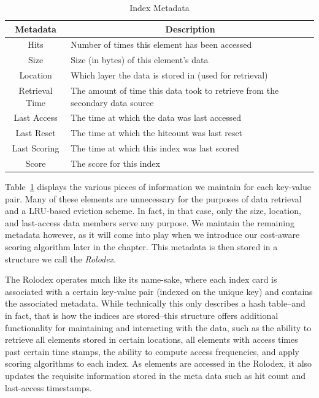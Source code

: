 \begin{table}[htp]
  \begin{center}
    \begin{tabular}{|c|l|}
      \hline
      \multicolumn{1}{|c}{\textbf{Metadata}} &
      \multicolumn{1}{|c|}{\textbf{Description}}\\
      \hline
					Hits & Number of times this element has been accessed\\
					Size & Size (in bytes) of this element's data\\
		  Location & Which layer the data is stored in (used for retrieval)\\
Retrieval Time & The amount of time this data took to retrieve from the
			secondary data source\\
	 Last Access & The time at which the data was last accessed\\
		Last Reset & The time at which the hitcount was last reset\\
	Last Scoring & The time at which this index was last scored\\
				 Score & The score for this index\\
      \hline
    \end{tabular}
    \caption{Index Metadata}
    \label{tab:metadata}
  \end{center}
\end{table}

Table~\ref{tab:metadata} displays the various pieces of information we maintain
for each key-value pair. Many of these elements are unnecessary for the
purposes of data retrieval and a LRU-based eviction scheme. In fact, in that
case, only the size, location, and last-access data members serve any purpose.
We maintain the remaining metadata however, as it will come into play when we
introduce our cost-aware scoring algorithm later in the chapter. This metadata
is then stored in a structure we call the \emph{Rolodex}.

The Rolodex operates much like its name-sake, where each index card is
associated with a certain key-value pair (indexed on the unique key) and
contains the associated metadata. While technically this only describes a hash
table--and in fact, that is how the indices are stored--this structure offers
additional functionality for maintaining and interacting with the data, such as
the ability to retrieve all elements stored in certain locations, all elements
with access times past certain time stamps, the ability to compute access
frequencies, and apply scoring algorithms to each index. As elements are
accessed in the Rolodex, it also updates the requisite information stored in
the meta data such as hit count and last-access timestamps.

